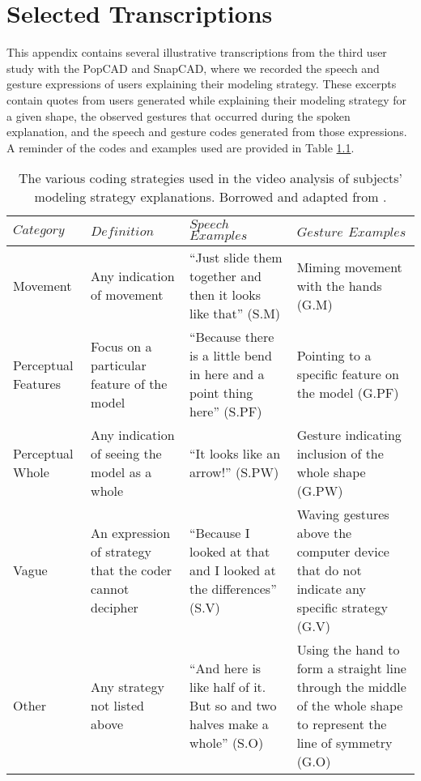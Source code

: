 \chapter{Selected Transcriptions}

This appendix contains several illustrative transcriptions from the third user
study with the PopCAD and SnapCAD, where we recorded the speech and gesture
expressions of users explaining their modeling strategy. These excerpts contain
quotes from users generated while explaining their modeling strategy for a given
shape, the observed gestures that occurred during the spoken explanation, and
the speech and gesture codes generated from those expressions. A reminder of the
codes and examples used are provided in Table \ref{GcodingStrategy}.

\begin{table}[!ht]
\small
    \caption[Coding rubric for speech and gesture during user explanation of
    modeling strategy]{ The various coding strategies used in the video
    analysis of subjects' modeling strategy explanations. Borrowed and adapted
    from \cite{ehrlich2006importance}.}
    \begin{center}
    \begin{tabular}{| p{1.5cm} | p{4.2cm} | p{4.2cm} | p{4.2cm} |} \hline
	$Category$ & $Definition$ &   $Speech$ $Examples$  & $Gesture$ $Examples$ \\
	\hline Movement & Any indication of movement & ``Just slide them together and then it
	looks like that'' (S.M) & Miming movement with the hands (G.M) \\ \hline 
	Perceptual Features & Focus on a particular feature of the model & ``Because
	there is a little bend in here and a point thing here'' (S.PF) & Pointing to a
	specific feature on the model (G.PF) \\ \hline 
	Perceptual Whole & Any indication of seeing the model as a whole & ``It looks
	like an arrow!'' (S.PW) & Gesture indicating inclusion of the whole shape 
	(G.PW) \\
	\hline Vague & An expression of strategy that the coder cannot decipher & ``Because I
	looked at that and I looked at the differences'' (S.V) & Waving gestures above
	the computer device that do not indicate any specific strategy (G.V) \\ \hline 
	Other & Any strategy not listed above & ``And here is like half of it.
	But so and two halves make a whole'' (S.O) & Using the hand to form a straight
	line through the middle of the whole shape to represent the line of symmetry
	(G.O)
	\\
	\hline
	\end{tabular}
   \\ \rule{0mm}{5mm}
\end{center}
\label{GcodingStrategy}
\end{table}


